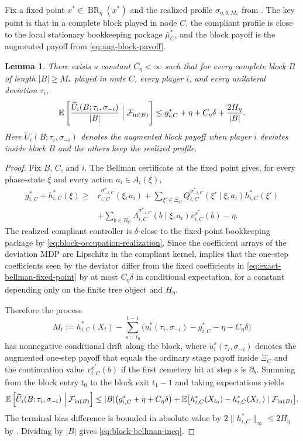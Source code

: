 \documentclass[12pt]{article}
\newtheorem{lemma}[theorem]{Lemma}
\theoremstyle{definition}
\newcommand{\E}{\mathbb{E}}
\newcommand{\1}{\mathbf{1}}
\newcommand{\cF}{\mathcal{F}}
\DeclareMathOperator{\BR}{BR}
\begin{document}
Fix a fixed point $x^*\in\BR_\eta(x^*)$ and the realized profile
$\sigma_{\eta,\delta,M_*}$ from . The key point is that in a
complete block played in node $C$, the compliant profile is close to the local
stationary bookkeeping package $\bar\mu_C^*$, and the block payoff is the
augmented payoff from \eqref{eq:aug-block-payoff}.

\begin{lemma}
\label{lem:block-bellman}
There exists a constant $C_\eta<\infty$ such that for every complete block $B$ of
length $|B|\ge M_*$ played in node $C$, every player $i$, and every unilateral
deviation $\tau_i$,
\begin{equation}
\label{eq:block-bellman-ineq}
\E\left[
\frac{\widetilde U_i(B;\tau_i,\sigma_{-i})}{|B|}
\Bigm|\cF_{\mathrm{in}(B)}
\right]
\le
 g_{i,C}^* + \eta + C_\eta\delta + \frac{2H_\eta}{|B|}.
\end{equation}
Here $\widetilde U_i(B;\tau_i,\sigma_{-i})$ denotes the augmented block payoff when
player $i$ deviates inside block $B$ and the others keep the realized profile.
\end{lemma}

\begin{proof}
Fix $B$, $C$, and $i$. The Bellman certificate at the fixed point gives, for every
phase-state $\xi$ and every action $a_i\in A_i(\xi)$,
\begin{align}
\label{eq:exact-bellman-fixed-point}
g_{i,C}^* + h_{i,C}^*(\xi)
\ge {}
&r_{i,C}^{\sigma_{-i,C}^*}(\xi,a_i)
+
\sum_{\xi'\in\Xi_C}Q_{i,C}^{\sigma_{-i,C}^*}(\xi'\mid\xi,a_i)h_{i,C}^*(\xi')
\\
&+
\sum_{b\in B_C}\Lambda_{i,C}^{\sigma_{-i,C}^*}(b\mid\xi,a_i)v_{i,C}^{x^*}(b)
-\eta.
\nonumber
\end{align}
The realized compliant controller is $\delta$-close to the fixed-point bookkeeping
package by \eqref{eq:block-occupation-realization}. Since the coefficient arrays of
the deviation MDP are Lipschitz in the compliant kernel,
 implies that the one-step coefficients seen by the
deviator differ from the fixed coefficients in
\eqref{eq:exact-bellman-fixed-point} by at most $C_\eta\delta$ in conditional
expectation, for a constant depending only on the finite tree object and $H_\eta$.

Therefore the process
\[
M_t:=h_{i,C}^*(X_t)-\sum_{s=t_0}^{t-1}
\bigl(\widetilde u_i^s(\tau_i,\sigma_{-i})-g_{i,C}^*-\eta-C_\eta\delta\bigr)
\]
has nonnegative conditional drift along the block, where
$\widetilde u_i^s(\tau_i,\sigma_{-i})$ denotes the augmented one-step payoff that
equals the ordinary stage payoff inside $\Xi_C$ and the continuation value
$v_{i,C}^{x^*}(b)$ if the first cemetery hit at step $s$ is $\partial_b$. Summing
from the block entry $t_0$ to the block exit $t_1-1$ and taking expectations
yields
\[
\E\left[\widetilde U_i(B;\tau_i,\sigma_{-i})\Bigm|\cF_{\mathrm{in}(B)}\right]
\le
|B|\bigl(g_{i,C}^*+\eta+C_\eta\delta\bigr)
+
\E\bigl[h_{i,C}^*(X_{t_0})-h_{i,C}^*(X_{t_1})\mid\cF_{\mathrm{in}(B)}\bigr].
\]
The terminal bias difference is bounded in absolute value by
$2\|h_{i,C}^*\|_\infty\le 2H_\eta$ by . Dividing by $|B|$
gives \eqref{eq:block-bellman-ineq}.
\end{proof}
\end{document}
